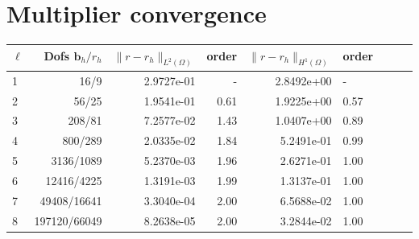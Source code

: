\documentclass{article}
\newcommand{\uu}[1]{\boldsymbol #1}
\begin{document}
\section*{Multiplier convergence}

\begin{tabular}{lrrrrllll}
\hline
$\ell$ &    Dofs $\uu{b}_h/r_h$ & $\|{r}-{r}_h\|_{L^2(\Omega)}$ & order & $\|{r}-{r}_h\|_{H^1(\Omega)}$ & order\\
\hline
 1 &        16/9 &  2.9727e-01 &     - &  2.8492e+00 &     - \\
 2 &        56/25 &  1.9541e-01 &     0.61 &  1.9225e+00 &     0.57 \\
 3 &       208/81 &  7.2577e-02 &     1.43 &  1.0407e+00 &     0.89 \\
 4 &       800/289 &  2.0335e-02 &     1.84 &  5.2491e-01 &     0.99 \\
 5 &      3136/1089 &  5.2370e-03 &     1.96 &  2.6271e-01 &     1.00 \\
 6 &     12416/4225 &  1.3191e-03 &     1.99 &  1.3137e-01 &     1.00 \\
 7 &     49408/16641 &  3.3040e-04 &     2.00 &  6.5688e-02 &     1.00 \\
 8 &    197120/66049 &  8.2638e-05 &     2.00 &  3.2844e-02 &     1.00 \\
\hline
\end{tabular}
\end{document}
